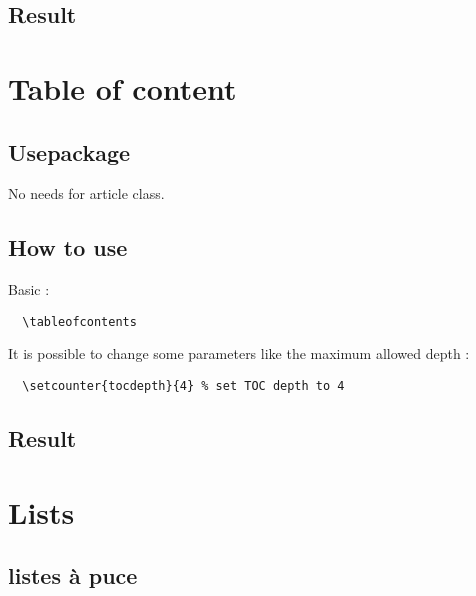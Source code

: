 \documentclass[a4paper,12pt]{article}
\begin{document}
\subsection{Result}

\begin{abstract}
\blindtext
\end{abstract}


\newpage
\section{Table of content}
\subsection{Usepackage}
No needs for article class.
\subsection{How to use}
Basic :
\begin{verbatim}
  \tableofcontents
\end{verbatim}
It is possible to change some parameters like the maximum allowed depth :
\begin{verbatim}
  \setcounter{tocdepth}{4} % set TOC depth to 4
\end{verbatim}
\subsection{Result}
  \tableofcontents



\newpage
\section{Lists}
\subsection{listes à puce}
\end{document}
